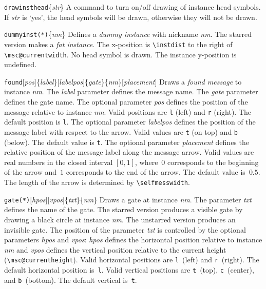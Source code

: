 \documentclass[a4paper]{article}
\newcommand{\cmd}[1]{\texttt{\bslash #1}}
\newcommand{\opt}[1]{[#1]}
\newenvironment{defs}{%
  \begin{list}{}%
              {\setlength{\labelwidth}{0pt}%
               \setlength{\labelsep}{1em}%
               \setlength{\leftmargin}{1em}%
               \setlength{\parsep}{1ex}%
               \setlength{\listparindent}{0pt}%
               \setlength{\rightmargin}{0pt}%
               \renewcommand{\makelabel}[1]{##1}%
               \raggedright%
              }%
  }{%
  \end{list}}
\begin{document}
\begin{defs}
\item[\cmd{drawinsthead}\{\emph{str}\}] A command to turn on/off
drawing of instance head symbols. If \emph{str} is `yes', the head
symbols will be drawn, otherwise they will not be drawn.

\item[\cmd{dummyinst(*)}\{\emph{nm}\}] Defines a \emph{dummy instance}
with nickname \emph{nm}. The starred version makes a \emph{fat
instance}. The x-position is \verb|\instdist| to the right of
\verb|\msc@currentwidth|. No head symbol is drawn. The
instance y-position is undefined.

\item[\cmd{found}\opt{\emph{pos}}\{\emph{label}\}\opt{\emph{labelpos}}\{\emph{gate}\}\{\emph{nm}\}\opt{\emph{placement}}]
Draws a \emph{found message} to instance \emph{nm}. The \emph{label}
parameter defines the message name. The \emph{gate} parameter defines
the gate name.  The optional parameter \emph{pos} defines the position
of the message relative to instance \emph{nm}. Valid positions are
\verb|l| (left) and \verb|r| (right). The default position is
\verb|l|.  The optional parameter \emph{labelpos} defines the position
of the message label with respect to the arrow. Valid values are
\verb+t+ (on top) and \verb+b+ (below). The default value is \verb+t+.
The optional parameter \emph{placement} defines the relative position
of the message label along the message arrow. Valid values are real
numbers in the closed interval $[0,1]$, where~$0$ corresponds to the
beginning of the arrow and~$1$ corresponds to the end of the
arrow. The default value is~$0.5$. The length of the arrow is
determined by \verb+\selfmesswidth+.

\item[\cmd{gate(*)}\opt{\emph{hpos}}\opt{\emph{vpos}}\{\emph{txt}\}\{\emph{nm}\}]
Draws a gate at instance \emph{nm}. The parameter \emph{txt} defines
the name of the gate. The starred version produces a visible gate by
drawing a black circle at instance \emph{nm}. The unstarred version
produces an invisible gate. The position of the parameter \emph{txt}
is controlled by the optional parameters \emph{hpos} and \emph{vpos}:
\emph{hpos} defines the horizontal position relative to instance
\emph{nm} and \emph{vpos} defines the vertical position relative to
the current height (\verb|\msc@currentheight|). Valid horizontal
positions are \verb|l|~(left) and \verb|r|~(right). The default
horizontal position is~\verb|l|.  Valid vertical positions are
\verb|t|~(top), \verb|c|~(center), and \verb|b|~(bottom). The default
vertical is~\verb|t|.


\end{defs}
\end{document}
